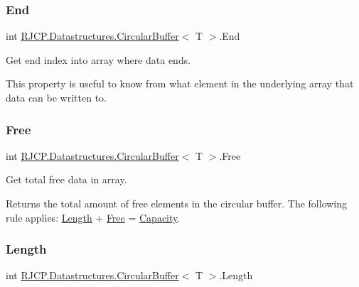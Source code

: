 \subsubsection{\texorpdfstring{End}{End}}
{\footnotesize\ttfamily int \mbox{\hyperlink{class_r_j_c_p_1_1_datastructures_1_1_circular_buffer}{R\+J\+C\+P.\+Datastructures.\+Circular\+Buffer}}$<$ T $>$.End\hspace{0.3cm}{\ttfamily [get]}}



Get end index into array where data ends. 

This property is useful to know from what element in the underlying array that data can be written to. \mbox{\label{class_r_j_c_p_1_1_datastructures_1_1_circular_buffer_a4ce60906784a0ded9d17cc8cfccf846d}} 
\subsubsection{\texorpdfstring{Free}{Free}}
{\footnotesize\ttfamily int \mbox{\hyperlink{class_r_j_c_p_1_1_datastructures_1_1_circular_buffer}{R\+J\+C\+P.\+Datastructures.\+Circular\+Buffer}}$<$ T $>$.Free\hspace{0.3cm}{\ttfamily [get]}}



Get total free data in array. 

Returns the total amount of free elements in the circular buffer. The following rule applies\+: \mbox{\hyperlink{class_r_j_c_p_1_1_datastructures_1_1_circular_buffer_a92b47b98334085d7655fd547b8d46c69}{Length}} + \mbox{\hyperlink{class_r_j_c_p_1_1_datastructures_1_1_circular_buffer_a4ce60906784a0ded9d17cc8cfccf846d}{Free}} = \mbox{\hyperlink{class_r_j_c_p_1_1_datastructures_1_1_circular_buffer_a823e88a213f382917ea0f9f9170c14af}{Capacity}}. \mbox{\label{class_r_j_c_p_1_1_datastructures_1_1_circular_buffer_a92b47b98334085d7655fd547b8d46c69}} 
\subsubsection{\texorpdfstring{Length}{Length}}
{\footnotesize\ttfamily int \mbox{\hyperlink{class_r_j_c_p_1_1_datastructures_1_1_circular_buffer}{R\+J\+C\+P.\+Datastructures.\+Circular\+Buffer}}$<$ T $>$.Length\hspace{0.3cm}{\ttfamily [get]}}



